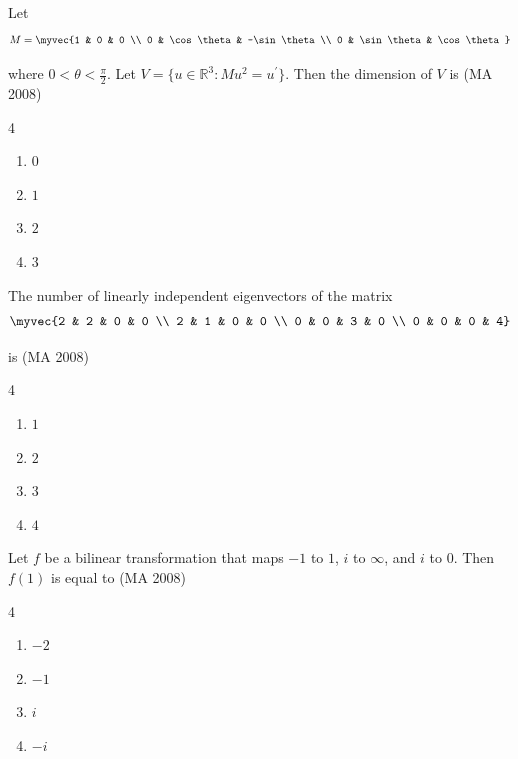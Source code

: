 \item
Let
\begin{align}
    M = \myvec{1 & 0 & 0 \\ 0 & \cos\theta & -\sin\theta \\ 0 & \sin\theta & \cos\theta}
\end{align}


where $0 < \theta < \frac{\pi}{2}$. Let $V = \{ u \in \mathbb{R}^3 : M u^2 = u^{\prime} \}$. Then the dimension of $V$ is
\hfill (MA 2008)
\begin{multicols}{4}
\begin{enumerate}
    \item $0$
    \item $1$
    \item $2$
    \item $3$
\end{enumerate}
\end{multicols}


\item
The number of linearly independent eigenvectors of the matrix
\begin{align}
   \myvec{2 & 2 & 0 & 0 \\ 2 & 1 & 0 & 0 \\ 0 & 0 & 3 & 0 \\ 0 & 0 & 0 & 4} 
\end{align}

is
\hfill (MA 2008)
\begin{multicols}{4}
\begin{enumerate}
    \item $1$
    \item $2$
    \item $3$
    \item $4$
\end{enumerate}
\end{multicols}

\item
Let $f$ be a bilinear transformation that maps $-1$ to $1$, $i$ to $\infty$, and $i$ to $0$. Then $f(1)$ is equal to
\hfill (MA 2008)
\begin{multicols}{4}
\begin{enumerate}
    \item $-2$
    \item $-1$
    \item $i$
    \item $-i$
\end{enumerate}
\end{multicols}


